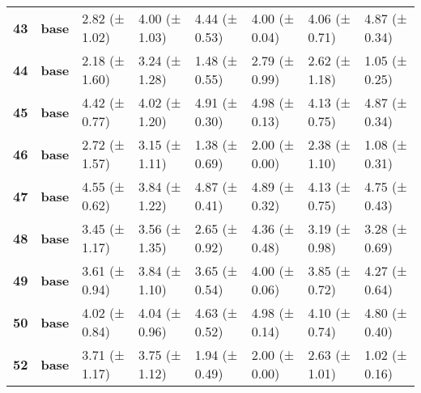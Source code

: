 \begin{longtable}{llllllll}
\cline{1-8}
\textbf{43} & \textbf{base} & 2.82 (± 1.02) & 4.00 (± 1.03) & 4.44 (± 0.53) & 4.00 (± 0.04) & 4.06 (± 0.71) & 4.87 (± 0.34) \\
\cline{1-8}
\textbf{44} & \textbf{base} & 2.18 (± 1.60) & 3.24 (± 1.28) & 1.48 (± 0.55) & 2.79 (± 0.99) & 2.62 (± 1.18) & 1.05 (± 0.25) \\
\cline{1-8}
\textbf{45} & \textbf{base} & 4.42 (± 0.77) & 4.02 (± 1.20) & 4.91 (± 0.30) & 4.98 (± 0.13) & 4.13 (± 0.75) & 4.87 (± 0.34) \\
\cline{1-8}
\textbf{46} & \textbf{base} & 2.72 (± 1.57) & 3.15 (± 1.11) & 1.38 (± 0.69) & 2.00 (± 0.00) & 2.38 (± 1.10) & 1.08 (± 0.31) \\
\cline{1-8}
\textbf{47} & \textbf{base} & 4.55 (± 0.62) & 3.84 (± 1.22) & 4.87 (± 0.41) & 4.89 (± 0.32) & 4.13 (± 0.75) & 4.75 (± 0.43) \\
\cline{1-8}
\textbf{48} & \textbf{base} & 3.45 (± 1.17) & 3.56 (± 1.35) & 2.65 (± 0.92) & 4.36 (± 0.48) & 3.19 (± 0.98) & 3.28 (± 0.69) \\
\cline{1-8}
\textbf{49} & \textbf{base} & 3.61 (± 0.94) & 3.84 (± 1.10) & 3.65 (± 0.54) & 4.00 (± 0.06) & 3.85 (± 0.72) & 4.27 (± 0.64) \\
\cline{1-8}
\textbf{50} & \textbf{base} & 4.02 (± 0.84) & 4.04 (± 0.96) & 4.63 (± 0.52) & 4.98 (± 0.14) & 4.10 (± 0.74) & 4.80 (± 0.40) \\
\cline{1-8}
\textbf{52} & \textbf{base} & 3.71 (± 1.17) & 3.75 (± 1.12) & 1.94 (± 0.49) & 2.00 (± 0.00) & 2.63 (± 1.01) & 1.02 (± 0.16) \\
\cline{1-8}
\end{longtable}
